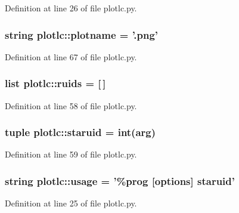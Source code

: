 Definition at line 26 of file plotlc.py.

\hypertarget{namespaceplotlc_ac18e7742b8c5f7d21a2efe570d6e2baa}{
\subsubsection[{plotname}]{\setlength{\rightskip}{0pt plus 5cm}string {\bf plotlc::plotname} = '.png'}}
\label{namespaceplotlc_ac18e7742b8c5f7d21a2efe570d6e2baa}


Definition at line 67 of file plotlc.py.

\hypertarget{namespaceplotlc_ac4ddf97fd899d00422bd2044f1695339}{
\subsubsection[{ruids}]{\setlength{\rightskip}{0pt plus 5cm}list {\bf plotlc::ruids} = \mbox{[}$\,$\mbox{]}}}
\label{namespaceplotlc_ac4ddf97fd899d00422bd2044f1695339}


Definition at line 58 of file plotlc.py.

\hypertarget{namespaceplotlc_a0f4044b7c539ef06d771594b766ca44b}{
\subsubsection[{staruid}]{\setlength{\rightskip}{0pt plus 5cm}tuple {\bf plotlc::staruid} = int(arg)}}
\label{namespaceplotlc_a0f4044b7c539ef06d771594b766ca44b}


Definition at line 59 of file plotlc.py.

\hypertarget{namespaceplotlc_ae4114e18ea1de203a5df329cabaf76e5}{
\subsubsection[{usage}]{\setlength{\rightskip}{0pt plus 5cm}string {\bf plotlc::usage} = '\%prog \mbox{[}options\mbox{]} {\bf staruid}'}}
\label{namespaceplotlc_ae4114e18ea1de203a5df329cabaf76e5}


Definition at line 25 of file plotlc.py.

